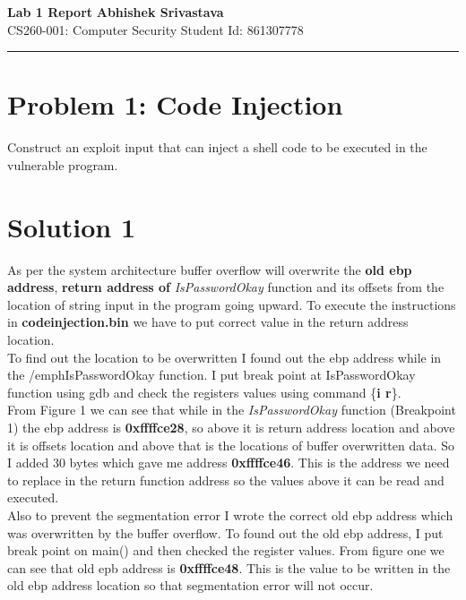 \documentclass[a4paper, 11pt]{article}
\begin{document}
\noindent
\large\textbf{Lab 1 Report} \hfill \textbf{Abhishek Srivastava} \\
\normalsize CS260-001: Computer Security \hfill Student Id: 861307778 \\
\hrule

\section*{Problem 1: Code Injection}
Construct an exploit input that can inject a shell code to be executed in the vulnerable program.

\section*{Solution 1}
As per the system architecture buffer overflow will overwrite the \textbf{old ebp address}, \textbf{return address of} \emph{IsPasswordOkay} function and its offsets from the location of string input in the program going upward. To execute the instructions in \textbf{codeinjection.bin} we have to put correct value in the return address location.\\

To find out the location to be overwritten I found out the ebp address while in the /emph{IsPasswordOkay} function. I put break point at IsPasswordOkay function using gdb and check the registers values using command \{\textbf{i r}\}.\\

From Figure 1 we can see that while in the \emph{IsPasswordOkay} function (Breakpoint 1) the ebp address is \textbf{0xffffce28}, so above it is return address location and above it is offsets location and above that is the locations of buffer overwritten data. So I added 30 bytes which gave me address \textbf{0xffffce46}. This is the address we need to replace in the return function address so the values above it can be read and executed.\\

Also to prevent the segmentation error I wrote the correct old ebp address which was overwritten by the buffer overflow. To found out the old ebp address, I put break point on main() and then checked the register values. From figure one we can see that old epb address is \textbf{0xffffce48}. This is the value to be written in the old ebp address location so that segmentation error will not occur.\\
\end{document}
